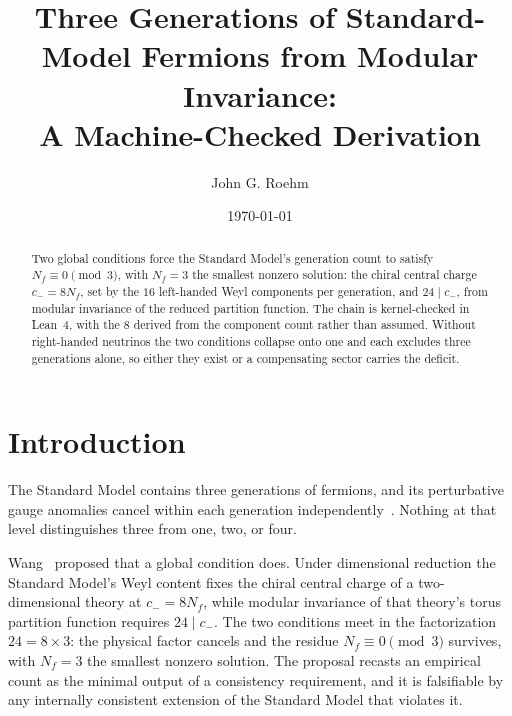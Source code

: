 \documentclass[aps,prl,twocolumn,superscriptaddress,nofootinbib]{revtex4-2}
\begin{document}
\title{Three Generations of Standard-Model Fermions from Modular Invariance:\\
A Machine-Checked Derivation}

\author{John G. Roehm}

\date{\today}

\begin{abstract}
Two global conditions force the Standard Model's generation count to
satisfy $N_f \equiv 0 \pmod 3$, with $N_f = 3$ the smallest nonzero
solution: the chiral central charge $c_- = 8 N_f$, set by the $16$
left-handed Weyl components per generation, and $24 \mid c_-$, from
modular invariance of the reduced partition function. The chain is
kernel-checked in Lean~4, with the $8$ derived from the component count
rather than assumed. Without right-handed neutrinos the two conditions
collapse onto one and each excludes three generations alone, so either
they exist or a compensating sector carries the deficit.
\end{abstract}

\maketitle

\section{Introduction}

The Standard Model contains three generations of fermions, and its
perturbative gauge anomalies cancel within each generation
independently~\cite{GrossJackiw1972}. Nothing at that level
distinguishes three from one, two, or four.

Wang~\cite{Wang2024} proposed that a global condition does. Under
dimensional reduction the Standard Model's Weyl content fixes the
chiral central charge of a two-dimensional theory at $c_- = 8 N_f$,
while modular invariance of that theory's torus partition function
requires $24 \mid c_-$. The two conditions meet in the factorization
$24 = 8 \times 3$: the physical factor cancels and the residue
$N_f \equiv 0 \pmod 3$ survives, with $N_f = 3$ the smallest nonzero
solution. The proposal recasts an empirical count as the minimal output
of a consistency requirement, and it is falsifiable by any internally
consistent extension of the Standard Model that violates it.
\end{document}
